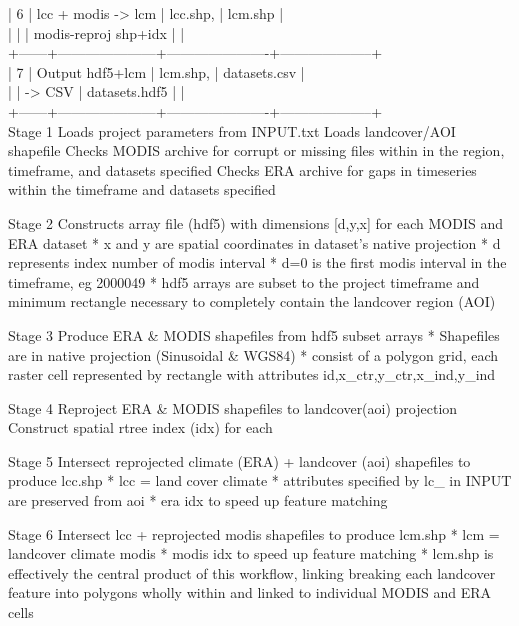 \documentclass[twoside,a4paper]{refart}
\begin{document}
    | 6    | lcc + modis -> lcm  | lcc.shp,             | lcm.shp            |\\
    |      |                     | modis-reproj shp+idx |                    |\\
    +------+---------------------+----------------------+--------------------+\\
    | 7    |  Output hdf5+lcm    | lcm.shp,             | datasets.csv       |\\
    |      |  -> CSV             | datasets.hdf5        |                    |\\
    +------+---------------------+----------------------+--------------------+\\



      Stage 1
        Loads project parameters from INPUT.txt
        Loads landcover/AOI shapefile
        Checks MODIS archive for corrupt or missing files
          within in the region, timeframe, and datasets specified
        Checks ERA archive for gaps in timeseries
          within the timeframe and datasets specified

      Stage 2
        Constructs array file (hdf5) with dimensions [d,y,x] for each
        MODIS and ERA dataset
        * x and y are spatial coordinates in dataset's native projection
        * d represents index number of modis interval
        * d=0 is the first modis interval in the timeframe, eg 2000049
        * hdf5 arrays are subset to the project timeframe and minimum
          rectangle necessary to completely contain the landcover region (AOI)

      Stage 3
        Produce ERA \& MODIS shapefiles from hdf5 subset arrays
        * Shapefiles are in native projection (Sinusoidal \& WGS84)
        * consist of a polygon grid, each raster cell represented by
          rectangle with attributes id,x\_ctr,y\_ctr,x\_ind,y\_ind

      Stage 4
        Reproject ERA \& MODIS shapefiles to landcover(aoi) projection
        Construct spatial rtree index (idx) for each

      Stage 5
        Intersect reprojected climate (ERA) + landcover (aoi) shapefiles
        to produce lcc.shp
          * lcc = land cover climate
          * attributes specified by lc\_ in INPUT are preserved from aoi
          * era idx to speed up feature matching

      Stage 6
        Intersect lcc + reprojected modis shapefiles to produce lcm.shp
        * lcm = landcover climate modis
        * modis idx to speed up feature matching
        * lcm.shp is effectively the central product of this workflow, linking
          breaking each landcover feature into polygons wholly within and
          linked to individual MODIS and ERA cells
\end{document}
